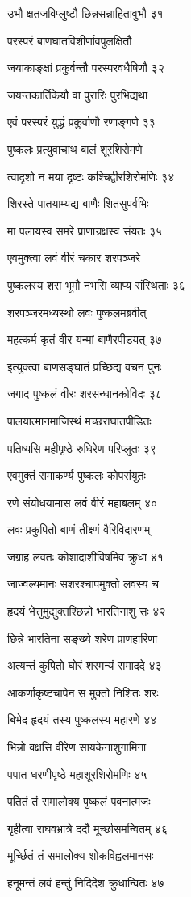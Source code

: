 उभौ क्षतजविप्लुष्टौ छिन्नसन्नाहितावुभौ ३१

परस्परं बाणघातविशीर्णावपुलक्षितौ

जयाकाङ्क्षां प्रकुर्वन्तौ परस्परवधैषिणौ ३२

जयन्तकार्तिकेयौ वा पुरारिः पुरभिद्यथा

एवं परस्परं युद्धं प्रकुर्वाणौ रणाङ्गणे ३३

पुष्कलः प्रत्युवाचाथ बालं शूरशिरोमणे

त्वादृशो न मया दृष्टः कश्चिद्वीरशिरोमणिः ३४

शिरस्ते पातयाम्यद्य बाणैः शितसुपर्वभिः

मा पलायस्व समरे प्राणान्रक्षस्व संयतः ३५

एवमुक्त्वा लवं वीरं चकार शरपञ्जरे

पुष्कलस्य शरा भूमौ नभसि व्याप्य संस्थिताः ३६

शरपञ्जरमध्यस्थो लवः पुष्कलमब्रवीत्

महत्कर्म कृतं वीर यन्मां बाणैरपीडयत् ३७

इत्युक्त्वा बाणसङ्घातं प्रच्छिद्य वचनं पुनः

जगाद पुष्कलं वीरः शरसन्धानकोविदः ३८

पालयात्मानमाजिस्थं मच्छराघातपीडितः

पतिष्यसि महीपृष्ठे रुधिरेण परिप्लुतः ३९

एवमुक्तं समाकर्ण्य पुष्कलः कोपसंयुतः

रणे संयोधयामास लवं वीरं महाबलम् ४०

लवः प्रकुपितो बाणं तीक्ष्णं वैरिविदारणम्

जग्राह लवतः कोशादाशीविषमिव क्रुधा ४१

जाज्वल्यमानः सशरश्चापमुक्तो लवस्य च

हृदयं भेत्तुमुद्युक्तश्छिन्नो भारतिनाशु सः ४२

छिन्ने भारतिना सङ्ख्ये शरेण प्राणहारिणा

अत्यन्तं कुपितो घोरं शरमन्यं समाददे ४३

आकर्णाकृष्टचापेन स मुक्तो निशितः शरः

बिभेद हृदयं तस्य पुष्कलस्य महारणे ४४

भिन्नो वक्षसि वीरेण सायकेनाशुगामिना

पपात धरणीपृष्ठे महाशूरशिरोमणिः ४५

पतितं तं समालोक्य पुष्कलं पवनात्मजः

गृहीत्वा राघवभ्रात्रे ददौ मूर्च्छासमन्वितम् ४६

मूर्च्छितं तं समालोक्य शोकविह्वलमानसः

हनूमन्तं लवं हन्तुं निदिदेश क्रुधान्वितः ४७

